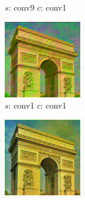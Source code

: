 \documentclass[12pt]{beamer}
\begin{document}
\begin{frame}
\begin{figure}[H]
\begin{subfigure}[b]{0.2\textwidth}
                \caption{$s$: conv9 $c$: conv1}
            \end{subfigure}
            \begin{subfigure}[b]{0.2\textwidth}
                \centering
                \includegraphics[width=\textwidth]{resources/gatys/layers/conv1_conv1.png}
                \caption{$s$: conv1  $c$: conv1}
            \end{subfigure}
            \hfill
            \begin{subfigure}[b]{0.2\textwidth}
                \centering
                \includegraphics[width=\textwidth]{resources/gatys/layers/conv1_conv3.png}

\end{subfigure}
\end{figure}
\end{frame}
\end{document}
